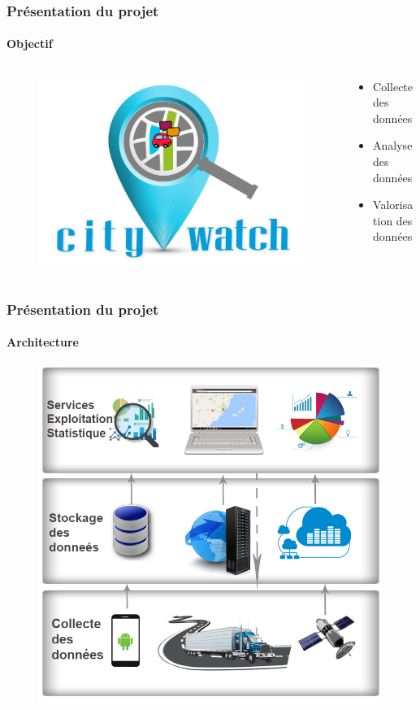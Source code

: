 \documentclass{beamer}
\begin{document}
\begin{frame}
    \frametitle{Présentation du projet}
    \framesubtitle{Objectif}
    \begin{columns}
        \begin{column}{0.5\textwidth}
            \begin{figure}
                \includegraphics[width=1\textwidth]{../figures/logo-citywatch.jpg}
            \end{figure}
        \end{column}
        \begin{column}{0.5\textwidth}
            \begin{itemize}
                \item<1-> Collecte des données
                \item<2-> Analyse des données
                \item<3-> Valorisation des données
            \end{itemize}
        \end{column}
    \end{columns}
\end{frame}

\begin{frame}
    \frametitle{Présentation du projet}
    \framesubtitle{Architecture}
    \begin{figure}
        \centering
    \includegraphics[width=.63\textwidth]{../figures/citywatch-modules.png}
\end{figure}
\end{frame}
\end{document}
